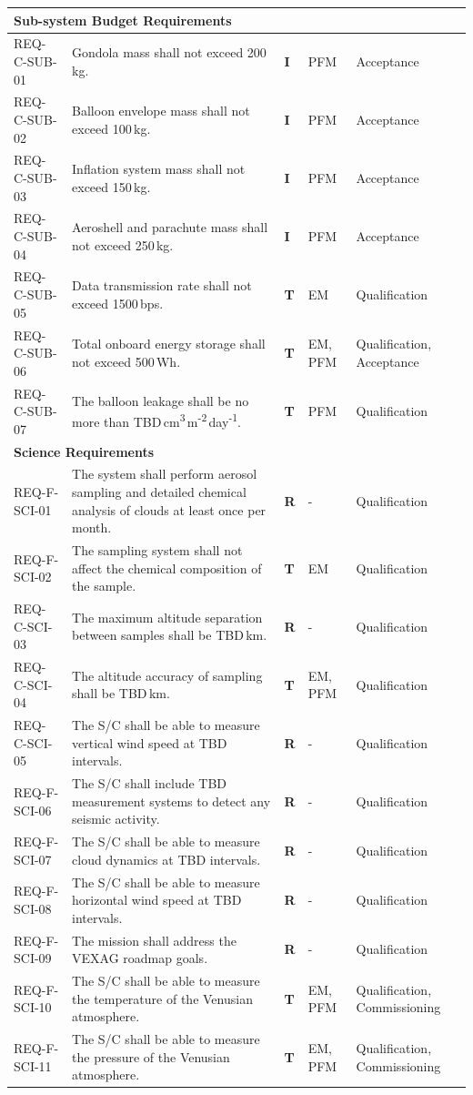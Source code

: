 {\begin{longtable}{p{2.85cm} p{6.2cm} p{1.2cm} p{1.6cm} p{1.8cm}}
\midrule
\multicolumn{5}{l}{\textbf{Sub-system Budget Requirements}} \\
\midrule

REQ-C-SUB-01 & Gondola mass shall not exceed 200\,kg. & \textbf{I} & PFM & Acceptance \\
REQ-C-SUB-02 & Balloon envelope mass shall not exceed 100\,kg. & \textbf{I} & PFM & Acceptance \\
REQ-C-SUB-03 & Inflation system mass shall not exceed 150\,kg. & \textbf{I} & PFM & Acceptance \\
REQ-C-SUB-04 & Aeroshell and parachute mass shall not exceed 250\,kg. & \textbf{I} & PFM & Acceptance \\
REQ-C-SUB-05 & Data transmission rate shall not exceed 1500\,bps. & \textbf{T} & EM & Qualification \\
REQ-C-SUB-06 & Total onboard energy storage shall not exceed 500\,Wh. & \textbf{T} & EM, PFM & Qualification, Acceptance \\
REQ-C-SUB-07 & The balloon leakage shall be no more than TBD\,cm\textsuperscript{3}\,m\textsuperscript{-2}\,day\textsuperscript{-1}. & \textbf{T} & PFM & Qualification \\

\midrule
\multicolumn{5}{l}{\textbf{Science Requirements}} \\
\midrule

REQ-F-SCI-01 & The system shall perform aerosol sampling and detailed chemical analysis of clouds at least once per month. & \textbf{R} & - & Qualification \\
REQ-F-SCI-02 & The sampling system shall not affect the chemical composition of the sample. & \textbf{T} & EM & Qualification \\
REQ-C-SCI-03 & The maximum altitude separation between samples shall be TBD\,km. & \textbf{R} & - & Qualification \\
REQ-C-SCI-04 & The altitude accuracy of sampling shall be TBD\,km. & \textbf{T} & EM, PFM & Qualification \\
REQ-C-SCI-05 & The S/C shall be able to measure vertical wind speed at TBD intervals. & \textbf{R} & - & Qualification \\
REQ-F-SCI-06 & The S/C shall include TBD measurement systems to detect any seismic activity. & \textbf{R} & - & Qualification \\
REQ-F-SCI-07 & The S/C shall be able to measure cloud dynamics at TBD intervals. & \textbf{R} & - & Qualification \\
REQ-F-SCI-08 & The S/C shall be able to measure horizontal wind speed at TBD intervals. & \textbf{R} & - & Qualification \\
REQ-F-SCI-09 & The mission shall address the VEXAG roadmap goals. & \textbf{R} & - & Qualification \\
REQ-F-SCI-10 & The S/C shall be able to measure the temperature of the Venusian atmosphere. & \textbf{T} & EM, PFM & Qualification, Commissioning \\
REQ-F-SCI-11 & The S/C shall be able to measure the pressure of the Venusian atmosphere. & \textbf{T} & EM, PFM & Qualification, Commissioning \\


\end{longtable}}
